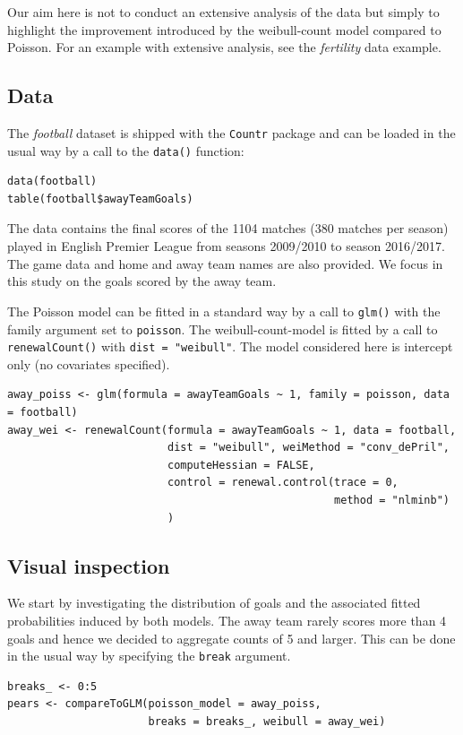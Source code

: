 \documentclass[a4paper,twoside,11pt]{article}
\begin{document}
Our aim here is not to conduct an extensive analysis of the data but simply to
highlight the improvement introduced by the weibull-count model compared to
Poisson. For an example with extensive analysis, see the \emph{fertility} data
example.


\subsection{Data}
\label{sec:orge516109}

The \emph{football} dataset is shipped with the \texttt{Countr} package and can be loaded
in the usual way by a call to the \texttt{data()} function:
\begin{verbatim}
data(football)
table(football$awayTeamGoals)
\end{verbatim}

The data contains the final scores of the 1104 matches (380 matches per season)
played in English Premier League from seasons 2009/2010 to season 2016/2017. The
game data and home and away team names are also provided. We focus in this study
on the goals scored by the away team.

The Poisson model can be fitted in a standard way by a call to \texttt{glm()} with the
family argument set to \texttt{poisson}. The weibull-count-model is fitted by a call to
\texttt{renewalCount()} with \texttt{dist = "weibull"}. The model considered here is intercept
only (no covariates specified).
\begin{verbatim}
away_poiss <- glm(formula = awayTeamGoals ~ 1, family = poisson, data = football)
away_wei <- renewalCount(formula = awayTeamGoals ~ 1, data = football,
                         dist = "weibull", weiMethod = "conv_dePril",
                         computeHessian = FALSE, 
                         control = renewal.control(trace = 0,
                                                   method = "nlminb")
                         )
\end{verbatim}



\subsection{Visual inspection}
\label{sec:org52445c5}

We start by investigating the distribution of goals and the associated fitted
probabilities induced by both models. The away team rarely scores more than 4
goals and hence we decided to aggregate counts of 5 and larger. This can be done
in the usual way by specifying the \texttt{break} argument.
\begin{verbatim}
breaks_ <- 0:5
pears <- compareToGLM(poisson_model = away_poiss,
                      breaks = breaks_, weibull = away_wei)
\end{verbatim}
\end{document}
